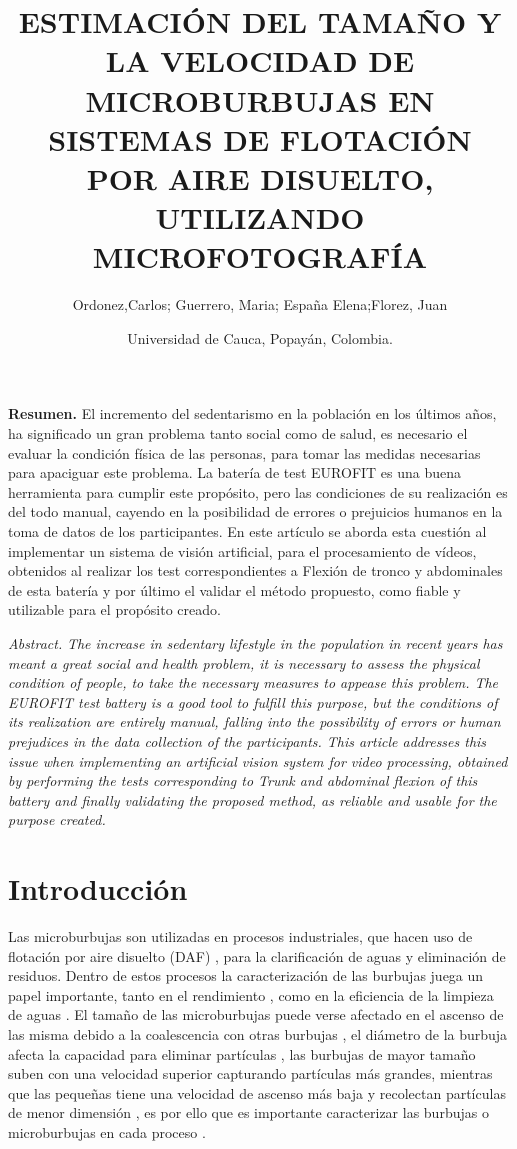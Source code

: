 \documentclass[12pt,twocolumn,a4paper]{article}
\title{ESTIMACIÓN DEL TAMAÑO Y LA VELOCIDAD DE
MICROBURBUJAS EN SISTEMAS DE FLOTACIÓN POR
AIRE DISUELTO, UTILIZANDO MICROFOTOGRAFÍA}
\author{Ordonez,Carlos;  Guerrero, Maria; España Elena;Florez, Juan 
 \\ 
\and{Universidad de Cauca, Popayán, Colombia.}\\
}
\begin{document}
\maketitle
\textbf{Resumen.}
El incremento del sedentarismo en la población en los últimos años, ha significado un gran problema tanto social como de salud, es necesario el evaluar la condición física de las personas, para tomar las medidas necesarias para apaciguar este problema. La batería de test EUROFIT es una buena herramienta para cumplir este propósito, pero las condiciones de su realización es del todo manual, cayendo en la posibilidad de errores o prejuicios humanos en la toma de datos de los participantes. En este artículo se aborda esta cuestión al implementar un sistema de visión artificial, para el procesamiento de vídeos, obtenidos al realizar los test correspondientes a Flexión de tronco y abdominales de esta batería y por último el validar el método propuesto, como  fiable y utilizable para el propósito creado.

\textit{Abstract.}  
\textit{The increase in sedentary lifestyle in the population in recent years has meant a great social and health problem, it is necessary to assess the physical condition of people, to take the necessary measures to appease this problem. The EUROFIT test battery is a good tool to fulfill this purpose, but the conditions of its realization are entirely manual, falling into the possibility of errors or human prejudices in the data collection of the participants. This article addresses this issue when implementing an artificial vision system for video processing, obtained by performing the tests corresponding to Trunk and abdominal flexion of this battery and finally validating the proposed method, as reliable and usable for the purpose created.}

\section{Introducción}

Las microburbujas son utilizadas en procesos industriales, que hacen uso de flotación por aire disuelto (DAF) \cite{cheng2016bubble}, para la clarificación de aguas y eliminación de residuos. Dentro de estos procesos la caracterización de las burbujas juega un papel importante, tanto en el rendimiento \cite{gulden2018online} \cite{eskanlou2018interactional} \cite{reis2016study}, como en la eficiencia de la limpieza de aguas \cite{sadeghi2020experimental} \cite{fanaie2020effect}. El tamaño de las microburbujas puede verse afectado en el ascenso de las misma debido a la coalescencia con otras burbujas \cite{fanaie2020effect}, el diámetro de la burbuja afecta la capacidad para eliminar partículas \cite{sadeghi2020experimental}, las burbujas de mayor tamaño suben con una velocidad superior capturando partículas más grandes, mientras que las pequeñas tiene una velocidad de ascenso más baja y recolectan partículas de menor dimensión \cite{sadeghi2020experimental} \cite{brasileiro2020construction}, es por ello que es importante caracterizar las burbujas o microburbujas en cada proceso \cite{sadeghi2020experimental} \cite{ahmadi2014nano}.
\end{document}

